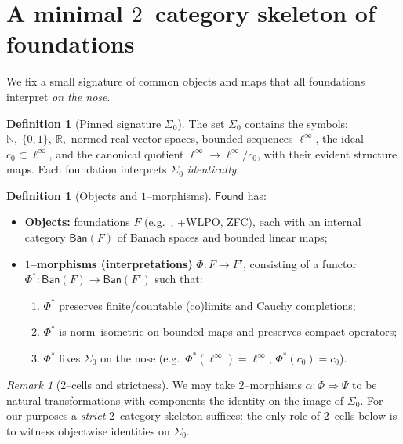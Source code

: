 \documentclass[11pt]{article}
\theoremstyle{definition}
\newtheorem{definition}[theorem]{Definition}
\theoremstyle{remark}
\newtheorem{remark}[theorem]{Remark}
\newcommand{\N}{\mathbb{N}}
\newcommand{\R}{\mathbb{R}}
\newcommand{\cnull}{c_0}
\newcommand{\linf}{\ell^\infty}
\newcommand{\WLPO}{\mathrm{WLPO}}
\newcommand{\BISH}{\mathrm{BISH}}
\newcommand{\Found}{\mathsf{Found}}
\newcommand{\Ban}{\mathsf{Ban}}
\newcommand{\SigmaZero}{\Sigma_{0}}
\begin{document}
\section{A minimal $2$--category skeleton of foundations}\label{sec:found}

We fix a small signature of common objects and maps that all foundations interpret \emph{on the nose}.

\begin{definition}[Pinned signature \(\SigmaZero\)]
The set \(\SigmaZero\) contains the symbols: \(\N,\ \{0,1\},\ \R,\) normed real vector spaces, bounded sequences \(\linf\), the ideal \(\cnull\subset\linf\), and the canonical quotient \(\linf\to \linf/\cnull\), with their evident structure maps. Each foundation interprets \(\SigmaZero\) \emph{identically}.
\end{definition}

\begin{definition}[Objects and $1$--morphisms]
\(\Found\) has:
\begin{itemize}
\item \textbf{Objects:} foundations \(F\) (e.g.\ \BISH, \BISH+$\WLPO$, ZFC), each with an internal category \(\Ban(F)\) of Banach spaces and bounded linear maps;
\item \textbf{$1$--morphisms (interpretations)} \(\Phi:F\to F'\), consisting of a functor \(\Phi^*:\Ban(F)\to\Ban(F')\) such that:
  \begin{enumerate}
  \item \(\Phi^*\) preserves finite/countable (co)limits and Cauchy completions;
  \item $\Phi^*$ is norm--isometric on bounded maps and preserves compact operators;
  \item $\Phi^*$ fixes \(\SigmaZero\) on the nose (e.g.\ \(\Phi^*(\linf)=\linf\), \(\Phi^*(\cnull)=\cnull\)).
  \end{enumerate}
\end{itemize}
\end{definition}

\begin{remark}[2--cells and strictness]
We may take \(2\)--morphisms \(\alpha:\Phi\Rightarrow\Psi\) to be natural transformations with components the identity on the image of \(\SigmaZero\). For our purposes a \emph{strict} $2$--category skeleton suffices: the only role of $2$--cells below is to witness objectwise identities on \(\SigmaZero\).
\end{remark}
\end{document}
